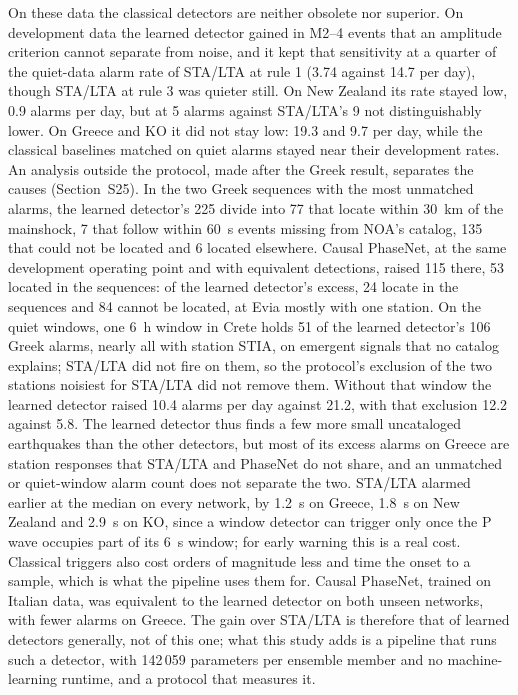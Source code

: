 \documentclass[a4paper,fleqn]{cas-sc}
\newcommand{\stalta}{STA/LTA}
\begin{document}
On these data the classical detectors are neither obsolete nor superior. On
development data the learned detector gained in M2--4 events that an amplitude criterion cannot
separate from noise, and it kept that sensitivity at a quarter of the quiet-data
alarm rate of \stalta{} at rule 1 (3.74 against 14.7 per day), though \stalta{} at
rule 3 was quieter still. On New Zealand its rate stayed low,
0.9 alarms per day, but at 5 alarms against \stalta{}'s 9 not distinguishably lower.
On Greece and KO it did not stay low: 19.3 and 9.7 per day, while the
classical baselines matched on quiet alarms stayed near their development rates. An analysis
outside the protocol, made after the Greek result, separates the causes
(Section~S25). In the two Greek sequences with the most unmatched alarms, the learned
detector's 225 divide into 77 that locate within 30~km of the mainshock, 7 that follow
within 60~s events missing from NOA's catalog, 135 that could not be located and 6
located elsewhere. Causal PhaseNet, at the same development operating point and with
equivalent detections, raised 115 there, 53 located in the sequences: of the learned
detector's excess, 24 locate in the sequences and 84 cannot be located, at Evia
mostly with one station. On the quiet windows, one 6~h window in Crete holds 51 of the learned
detector's 106 Greek alarms, nearly all with station STIA, on emergent signals that no
catalog explains; \stalta{} did not fire
on them, so the protocol's exclusion of the two stations noisiest for \stalta{} did
not remove them. Without that window the learned detector raised 10.4 alarms per day
against 21.2, with that exclusion 12.2 against 5.8. The learned detector thus finds a
few more small uncataloged earthquakes than the other detectors, but most of its
excess alarms on Greece are station responses that \stalta{} and PhaseNet do not
share, and an unmatched or quiet-window alarm count does not separate the two.
\stalta{} alarmed earlier at the median on every network, by 1.2~s on Greece, 1.8~s
on New Zealand and 2.9~s on KO, since a window detector can trigger only once the P
wave occupies part of its 6~s window; for early warning this is a real cost. Classical
triggers also cost orders of magnitude less and time the onset to a sample, which is
what the pipeline uses them for. Causal PhaseNet, trained on Italian data, was
equivalent to the learned detector on both unseen networks, with fewer alarms on
Greece.
The gain over \stalta{} is therefore that of learned detectors generally, not of this
one; what this study adds is a pipeline that runs such a detector, with 142\,059
parameters per ensemble member and no machine-learning runtime, and a protocol that
measures it.
\end{document}
